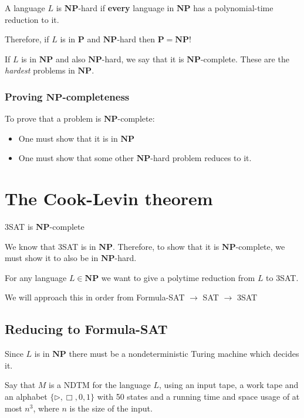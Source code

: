 \documentclass{article}
\newcommand{\NP}{\mathbf{NP}}
\renewcommand{\P}{\mathbf{P}}
\begin{document}
A language $L$ is $\NP$-hard if \textbf{every} language in $\NP$ has a polynomial-time reduction to it.

Therefore, if $L$ is in $\P$ and $\NP$-hard then $\P = \NP$!

If $L$ is in $\NP$ and also $\NP$-hard, we say that it is $\NP$-complete. These are the \textit{hardest} problems in $\NP$.

\subsubsection{Proving $\NP$-completeness}
\label{ssec:provingNPComplete}

To prove that a problem is $\NP$-complete:

\begin{itemize}
  \item One must show that it is in $\NP$
  \item One must show that some other $\NP$-hard problem reduces to it.
\end{itemize}

\section{The Cook-Levin theorem}
\label{sec:cook-levin}

\begin{theorem}
  \label{theorem:cook-levin}
  3SAT is $\NP$-complete
\end{theorem}

We know that 3SAT is in $\NP$. Therefore, to show that it is $\NP$-complete, we must show it to also be in $\NP$-hard.

For any language $L \in \NP$ we want to give a polytime reduction from $L$ to 3SAT.

We will approach this in order from Formula-SAT $\rightarrow$ SAT $\rightarrow $ 3SAT

\subsection{Reducing to Formula-SAT}
\label{subsec:r-fsat}

Since $L$ is in $\NP$ there must be a nondeterministic Turing machine which decides it.

Say that $M$ is a NDTM for the language $L$, using an input tape, a work tape and an alphabet $\{ \rhd, \Box, 0,1 \} $ with 50 states and a running time and space usage of at most $n^{3}$, where $n$ is the size of the input.
\end{document}

